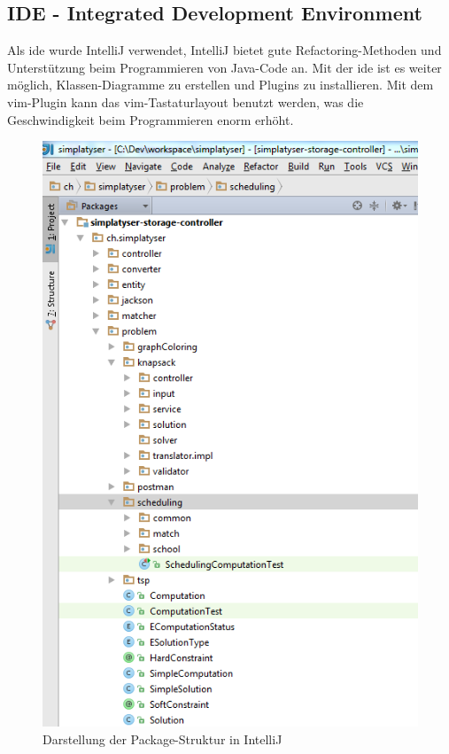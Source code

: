 \subsection{IDE - Integrated Development Environment}
Als \gls{ide} wurde IntelliJ \cite{intellij} verwendet, IntelliJ bietet gute Refactoring-Methoden und Unterstützung beim Programmieren von Java-Code an. Mit der \gls{ide} ist es weiter möglich, 
Klassen-Diagramme zu erstellen und Plugins zu installieren. Mit dem \gls{vim}-Plugin kann das \gls{vim}-Tastaturlayout benutzt werden, was die 
Geschwindigkeit beim Programmieren enorm erhöht.

\begin{figure}[h]
\centering
\includegraphics[scale=0.7]{images/IntelliJ.png}
\caption[Darstellung der Package-Struktur in IntelliJ]{Darstellung der Package-Struktur in IntelliJ \selfmade{}}
\label{fig:IntelliJ}
\end{figure}

